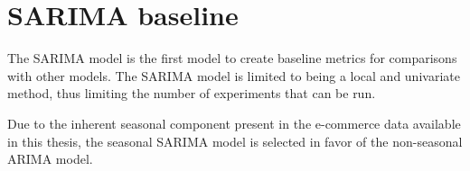 
\section{SARIMA baseline}
\label{section:Method:SARIMA}

The SARIMA model is the first model to create baseline metrics for comparisons with other models.
The SARIMA model is limited to being a local and univariate method,
thus limiting the number of experiments that can be run.

Due to the inherent seasonal component present in the e-commerce data available in this thesis,
the seasonal SARIMA model is selected in favor of the non-seasonal ARIMA model.

